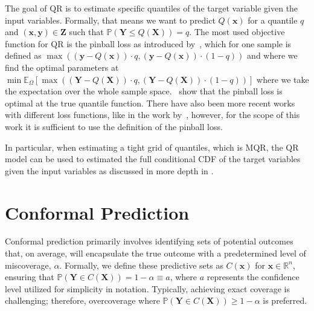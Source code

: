The goal of QR is to estimate specific quantiles of the target variable given the input variables. Formally, that means we want to predict $Q(\mathbf{x})$ for a quantile $q$ and $(\mathbf{x}, \mathbf{y})\in\mathbf{Z}$ such that $\mathbb{P}(\mathbf{Y} \leq Q(\mathbf{X})) = q$. The most used objective function for QR is the pinball loss as introduced by~\cite{koenker1978regression}, which for one sample is defined as $\max ((\mathbf{y} - Q(\mathbf{x})) \cdot q, (\mathbf{y} - Q(\mathbf{x})) \cdot (1 - q))$ and where we find the optimal parameters at $ \min \mathbb{E}_{\Omega}\left[ \max \left((\mathbf{Y} - Q(\mathbf{X})) \cdot q, (\mathbf{Y} - Q(\mathbf{X})) \cdot (1 - q)\right)\right]$ where we take the expectation over the whole sample space.~\cite{koenker1978regression} show that the pinball loss is optimal at the true quantile function. There have also been more recent works with different loss functions, like in the work by~\cite{chung2021beyond}, however, for the scope of this work it is sufficient to use the definition of the pinball loss.

In particular, when estimating a tight grid of quantiles, which is MQR, the QR model can be used to estimated the full conditional CDF of the target variables given the input variables as discussed in more depth in .

\section{Conformal Prediction}\label{sec:cp}

Conformal prediction primarily involves identifying sets of potential outcomes that, on average, will encapsulate the true outcome with a predetermined level of miscoverage, $\alpha$. Formally, we define these predictive sets as $C(\mathbf{x})$ for $\mathbf{x} \in \mathbb{R}^n$, ensuring that $\mathbb{P}(\mathbf{Y} \in C(\mathbf{X})) = 1 - \alpha \equiv a$, where $a$ represents the confidence level utilized for simplicity in notation. Typically, achieving exact coverage is challenging; therefore, overcoverage where $\mathbb{P}(\mathbf{Y} \in C(\mathbf{X})) \geq 1 - \alpha$ is preferred.

